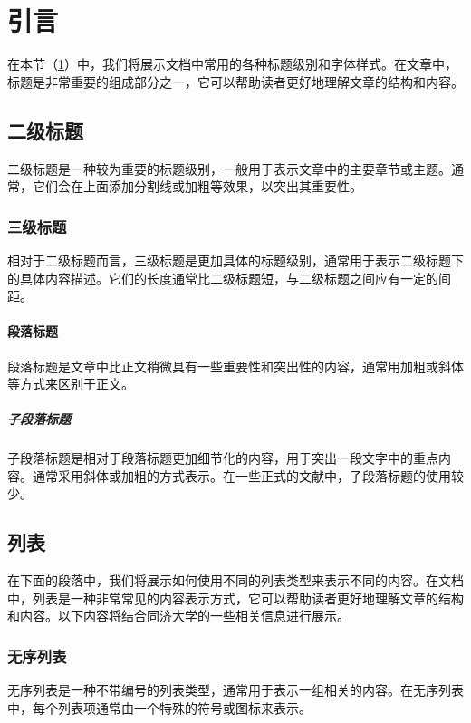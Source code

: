 \section{引言}\label{sec:introduction}

在本节（\cref{sec:introduction}）中，我们将展示文档中常用的各种标题级别和字体样式。在文章中，标题是非常重要的组成部分之一，它可以帮助读者更好地理解文章的结构和内容。

\subsection{二级标题}

二级标题是一种较为重要的标题级别，一般用于表示文章中的主要章节或主题。通常，它们会在上面添加分割线或加粗等效果，以突出其重要性。

\subsubsection{三级标题}

相对于二级标题而言，三级标题是更加具体的标题级别，通常用于表示二级标题下的具体内容描述。它们的长度通常比二级标题短，与二级标题之间应有一定的间距。

\paragraph{段落标题}

段落标题是文章中比正文稍微具有一些重要性和突出性的内容，通常用加粗或斜体等方式来区别于正文。

\subparagraph{子段落标题}

子段落标题是相对于段落标题更加细节化的内容，用于突出一段文字中的重点内容。通常采用斜体或加粗的方式表示。在一些正式的文献中，子段落标题的使用较少。

\subsection{列表}

在下面的段落中，我们将展示如何使用不同的列表类型来表示不同的内容。在文档中，列表是一种非常常见的内容表示方式，它可以帮助读者更好地理解文章的结构和内容。以下内容将结合同济大学的一些相关信息进行展示。

\subsubsection{无序列表}

无序列表是一种不带编号的列表类型，通常用于表示一组相关的内容。在无序列表中，每个列表项通常由一个特殊的符号或图标来表示。

